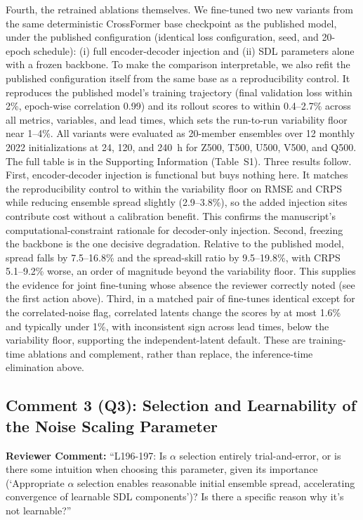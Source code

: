 \documentclass[12pt]{article}
\begin{document}
Fourth, the retrained ablations themselves. We fine-tuned two new variants from the
same deterministic CrossFormer base checkpoint as the published model, under the
published configuration (identical loss configuration, seed, and 20-epoch
schedule): (i) full
encoder-decoder injection and (ii) SDL parameters alone with a frozen backbone. To
make the comparison interpretable, we also refit the published configuration itself
from the same base as a reproducibility control. It reproduces the published model's
training trajectory (final validation loss within 2\%, epoch-wise correlation 0.99)
and its rollout scores to within 0.4--2.7\% across all metrics, variables, and lead
times, which sets the run-to-run variability floor near 1--4\%. All variants were
evaluated as 20-member ensembles over 12 monthly 2022 initializations at 24, 120, and
240~h for Z500, T500, U500, V500, and Q500. The full table is in the Supporting
Information (Table~S1). Three results follow. First, encoder-decoder injection is
functional but buys nothing here. It matches the reproducibility control to within
the variability floor on RMSE and CRPS while reducing ensemble spread slightly
(2.9--3.8\%), so the added injection sites contribute cost without a calibration
benefit. This confirms the manuscript's computational-constraint rationale for
decoder-only injection. Second, freezing the backbone is the one decisive
degradation. Relative to the published model, spread falls by 7.5--16.8\% and the
spread-skill ratio by 9.5--19.8\%, with CRPS 5.1--9.2\% worse, an order of magnitude
beyond the variability floor. This supplies the evidence for joint fine-tuning whose
absence the reviewer correctly noted (see the first action above). Third, in a
matched pair of fine-tunes identical except for the correlated-noise flag, correlated
latents change the scores by at most 1.6\% and typically under 1\%, with inconsistent
sign across lead times, below the variability floor, supporting the
independent-latent default. These are training-time ablations and complement,
rather than replace, the inference-time elimination above.

\subsection*{Comment 3 (Q3): Selection and Learnability of the Noise Scaling
Parameter}

\textbf{Reviewer Comment:} ``L196-197: Is $\alpha$ selection entirely trial-and-error,
or is there some intuition when choosing this parameter, given its importance
(`Appropriate $\alpha$ selection enables reasonable initial ensemble spread,
accelerating convergence of learnable SDL components')? Is there a specific reason why
it's not learnable?''
\end{document}
